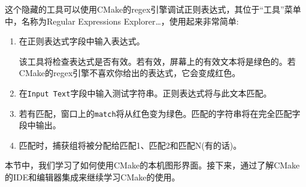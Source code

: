 这个隐藏的工具可以使用CMake的regex引擎调试正则表达式，其位于“工具”菜单中，名称为Regular Expressions Explorer…，使用起来非常简单:

\begin{enumerate}
\item 
在正则表达式字段中输入表达式。

该工具将检查表达式是否有效。若有效，屏幕上的有效文本将是绿色的。若CMake的regex引擎不喜欢你给出的表达式，它会变成红色。

\item 
在\texttt{Input Text}字段中输入测试字符串。正则表达式将与此文本匹配。

\item 
若有匹配，窗口上的\texttt{match}将从红色变为绿色。匹配的字符串将在完全匹配字段中输出。

\item 
匹配时，捕获组将被分配给匹配1、匹配2和匹配N(有的话)。
\end{enumerate}

本节中，我们学习了如何使用CMake的本机图形界面。接下来，通过了解CMake的IDE和编辑器集成来继续学习CMake的使用。
